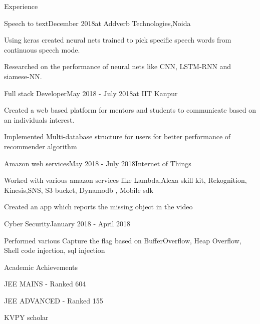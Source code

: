 \documentclass{resume}
\begin{document}
\begin{rSection}{Experience}

\begin{rSubsection}{Speech to text}{December 2018}{at Addverb Technologies,Noida}{}
\item Using keras created neural nets trained to pick specific speech words from continuous speech mode.
\item Researched on the performance of neural nets like CNN, LSTM-RNN and siamese-NN.
\end{rSubsection}

\begin{rSubsection}{Full stack Developer}{May 2018 - July 2018}{at IIT Kanpur}{}
\item Created a web based platform for mentors and students to communicate based on an individuals interest.
\item Implemented Multi-database structure for users for better performance of recommender algorithm
\end{rSubsection}



\begin{rSubsection}{Amazon web services}{May 2018 - July 2018}{Internet of Things}{}
\item Worked with various amazon services like Lambda,Alexa skill kit, Rekognition, Kinesis,SNS, S3 bucket, Dynamodb , Mobile sdk
\item Created an app which reports the missing object in the video
\end{rSubsection}


\begin{rSubsection}{Cyber Security}{January 2018 - April 2018}{}{}
\item Performed various Capture the flag based on BufferOverflow, Heap Overflow, Shell code injection, sql injection
\end{rSubsection}

\end{rSection}

\begin{rSection}{Academic Achievements} \itemsep -2pt
\item JEE MAINS - Ranked 604
\item JEE ADVANCED - Ranked 155
\item KVPY scholar
\end{rSection}

\clearpage
\end{document}
